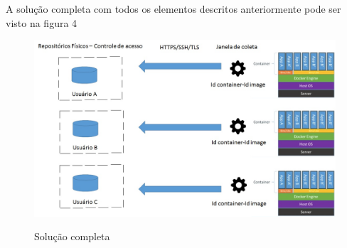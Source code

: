 \documentclass[conference]{IEEEtran}
\begin{document}
A solução completa com todos os elementos descritos anteriormente pode ser visto na figura 4

\begin{figure}[h]
\caption{Solução completa}
\includegraphics[scale=0.25]{solucao.jpg}
\label{fig:Solucao}
\end{figure}

%
%

\end{document}
